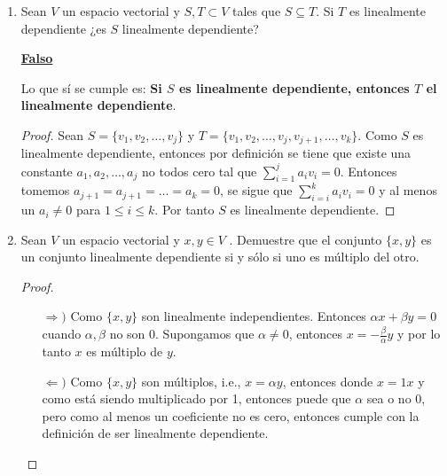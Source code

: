 \documentclass[11pt,letterpaper]{article}
\newcommand{\fals}{\textbf{\underline{Falso} }}
\begin{document}
\begin{enumerate}
\begin{proof}
    Sean $S = \{ v_1, v_2, \ldots, v_j \}$ y $T = \{ v_1, v_2, \ldots, v_j, v_{j+1}, \ldots, v_k \}$.
    Como $T$ es linealmente independiente, entonces $\sum_{i=1}^{k} a_i x_i = 0$, lo que por definición
    de independia lineal pasa si y sólo si $a_i = 0$ con $1 \leq i \leq k$. Como
    $a_{j+1} = a_{j+1} = \ldots = a_{k} = 0$, entonces $\sum_{i=j+1}^{k} a_i x_i = 0$,
    teniendo así que $\sum_{i=1}^{j} a_i x_i = 0$ si y sólo si $a_{1} = a_{2} = \ldots = a_{k} = 0$.
    Por tanto $S$ es linealmente independiente.
\end{proof}

\item Sean $V$ un espacio vectorial y $S,T \subset V$ tales que $S \subseteq T$. Si $T$
es linealmente dependiente ¿es $S$ linealmente dependiente?

\fals

Lo que sí se cumple es: \textbf{Si $S$ es linealmente dependiente, entonces $T$ el
linealmente dependiente}.

\begin{proof}
    Sean $S = \{ v_1, v_2, \ldots, v_j \}$ y $T = \{ v_1, v_2, \ldots, v_j, v_{j+1}, \ldots, v_k \}$.
    Como $S$ es linealmente dependiente, entonces por definición se tiene que existe una constante
    $a_1, a_2, \ldots, a_j$ no todos cero tal que $\sum_{i=1}^{j} a_i v_i = 0$. Entonces tomemos
    $a_{j+1} = a_{j+1} = \ldots = a_{k} = 0$, se sigue que $\sum_{i=i}^{k} a_i v_i = 0$ y al menos un 
    $a_i \neq 0$ para $1 \leq i \leq k$. Por tanto $S$ es linealmente dependiente.
\end{proof}

\item Sean $V$ un espacio vectorial y $x, y \in V$ . Demuestre que el conjunto $\{x, y\}$
es un conjunto linealmente dependiente si y sólo si uno es múltiplo del otro.

\begin{proof}
    \hfill
    \begin{itemize}
        \item[$\Longrightarrow)$] Como $\{x, y\}$ son linealmente independientes. Entonces
        $\alpha x + \beta y = 0$ cuando $\alpha, \beta$ no son 0. Supongamos que $\alpha \neq 0$,
        entonces $x = - \frac{\beta}{\alpha}y$ y por lo tanto $x$ es múltiplo de $y$.

        \item[$\Longleftarrow)$] Como $\{x, y\}$ son múltiplos, i.e., $x = \alpha y$, entonces
        donde $x = 1x$ y como está siendo multiplicado por 1, entonces puede que $\alpha$ sea
        o no 0, pero como al menos un coeficiente no es cero, entonces cumple con la definición
        de ser linealmente dependiente.
    \end{itemize}
\end{proof}



\end{enumerate}
\end{document}
